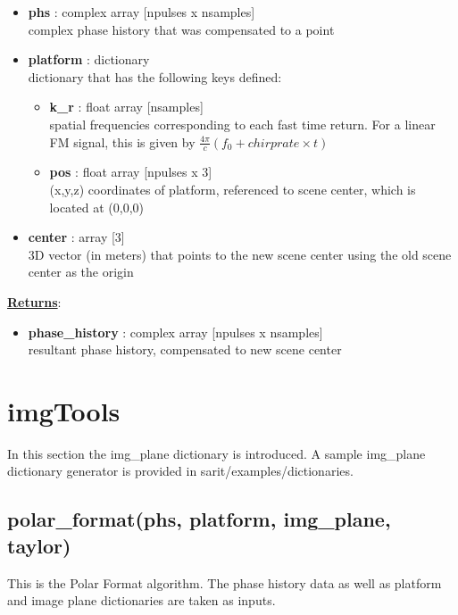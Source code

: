 \documentclass{article}
\newcommand{\defs}[2]{\textbf{{#1}} : {#2}}
\begin{document}
\begin{itemize}
	\item \defs{phs}{complex array [npulses x nsamples]}\\
  	complex phase history that was compensated to a point
  	\item \defs{platform}{dictionary}\\
  	dictionary that has the following keys defined:
	\begin{itemize}
	    \item\defs{k\_r}{float array [nsamples]}\\
	    	spatial frequencies corresponding to each fast time return.  For a linear FM signal, this is given by $\frac{4\pi}{c}(f_0+chirprate\times t)$
	    \item \defs{pos}{float array [npulses x 3]}\\
	       	(x,y,z) coordinates of platform, referenced to scene center, which is located at (0,0,0)
	\end{itemize}
	\item \defs{center}{array [3]}\\
  	3D vector (in meters) that points to the new scene center using the old scene center as the origin
\end{itemize}

\noindent \underline{\textbf{Returns}}:
\begin{itemize}
	\item \defs{phase\_history}{complex array [npulses x nsamples]}\\
	resultant phase history, compensated to new scene center
\end{itemize}

\newpage

\section{imgTools}
In this section the img\_plane dictionary is introduced.  A sample img\_plane dictionary generator is provided in sarit/examples/dictionaries.

\subsection{polar\_format(phs, platform, img\_plane, taylor)}
\label{sec:polar_format}
This is the Polar Format algorithm.  The phase history data as well as platform and image plane dictionaries are taken as inputs. 
\end{document}
